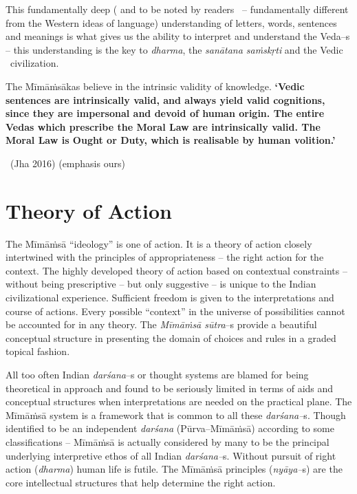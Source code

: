 This fundamentally deep ( and to be noted by readers  – fundamentally different from the Western ideas of language) understanding of letters, words, sentences and meanings is what gives us the ability to interpret and understand the Veda–s – this understanding is the key to \textit{dharma}, the \textit{sanātana saṁskṛti} and the Vedic  civilization.

\begin{myquote}
The Mīmāṁsākas believe in the intrinsic validity of knowledge. \textbf{ ‘Vedic sentences are intrinsically valid, and always yield valid cognitions, since they are impersonal and devoid of human origin. The entire Vedas which prescribe the Moral Law are intrinsically valid. The Moral Law is Ought or Duty, which is realisable by human volition.’}

~\hfill (Jha 2016) (emphasis ours)
\end{myquote}


\section*{Theory of Action}

The Mīmāṁsā “ideology” is one of action. It is a theory of action closely intertwined with the principles of appropriateness – the right action for the context. The highly developed theory of action based on contextual constraints – without being prescriptive – but only suggestive – is unique to the Indian civilizational experience. Sufficient freedom is given to the interpretations and course of actions. Every possible “context” in the universe of possibilities cannot be accounted for in any theory. The \textit{Mīmāṁsā sūtra}–s provide a beautiful conceptual structure in presenting the domain of choices and rules in a graded topical fashion.

All too often Indian \textit{darśana}–s or thought systems are blamed for being theoretical in approach and found to be seriously limited in terms of aids and conceptual structures when interpretations are needed on the practical plane. The Mīmāṁsā system is a framework that is common to all these \textit{darśana–}s. Though identified to be an independent \textit{darśana} (Pūrva–Mīmāṁsā) according to some classifications – Mīmāṁsā is actually considered by many to be the principal underlying interpretive ethos of all Indian \textit{darśana–}s. Without pursuit of right action (\textit{dharma}) human life is futile. The Mīmāṁsā principles (\textit{nyāya–}s) are the core intellectual structures that help determine the right action.


